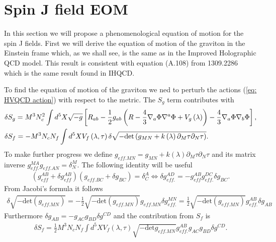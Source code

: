 \documentclass[a4paper,12pt]{article}
\begin{document}
\section{Spin J field EOM}

In this section we will propose a phenomenological equation of motion for the spin J fields. First we will derive the equation of motion of the graviton in the Einstein frame which, as we shall see, is the same as in the Improved Holographic QCD model. This result is consistent with equation (A.108) from 1309.2286 which is the same result found in IHQCD.

To find the equation of motion of the graviton we ned to perturb the actions (\ref{eq: HVQCD action}) with respect to the metric. The $S_g$ term contributes with
\begin{align}
&\delta S_g = M^3 N_c^2 \int d^5X \sqrt{-g} \left[ R_{ab} - \frac{1}{2} g_{ab} \left( R -\frac{4}{3} \nabla_a \Phi \nabla^a \Phi + V_g \left(\lambda\right) \right)- \frac{4}{3} \nabla_a \Phi \nabla_b \Phi \right],  \notag \\
& \delta S_f = - M^3 N_c N_f \int d^5 X V_f \left( \lambda, \tau \right) \delta \sqrt{- \text{det} \left( g_{MN} + k\left(\lambda\right) \partial_M \tau \partial_N \tau \right)}.
\end{align}
To make further progress we define $g_{eff. MN} = g_{MN} +  k\left(\lambda\right) \partial_M \tau \partial_N \tau $ and its matrix inverse $g_{eff.}^{MA}g_{eff. AN} = \delta^M_N$. The following identity will be useful
\begin{align}
\left( g_{eff}^{AB} + \delta  g_{eff}^{AB}\right) \left( g_{eff. BC} + \delta g_{BC}\right) = \delta^A_C \Leftrightarrow \delta g_{eff.}^{AD} = - g_{eff}^{AB} g_{eff.}^{DC} \delta g_{BC}.
\end{align}
From Jacobi's formula it follows
\begin{align}
\delta \sqrt{-\text{det} \left(g_{eff. MN}\right)} = -\frac{1}{2} \sqrt{-\text{det} \left(g_{eff. MN}\right)} g_{eff. MN} \delta g_{eff.}^{MN} = \frac{1}{2} \sqrt{-\text{det} \left(g_{eff. MN}\right)} g_{eff.}^{AB} \delta g_{AB}
\end{align}
Furthermore $\delta g_{AB} = - g_{AC} g_{BD} \delta g^{CD}$ and the contribution from $S_f$ is
\begin{align}
\delta S_f = \frac{1}{2} M^3 N_c N_f \int d^5X V_f\left(\lambda, \tau\right) \sqrt{-\text{det} g_{eff. MN}} g_{eff.}^{AB}g_{AC}g_{BD} \delta g^{CD}.
\end{align}
\end{document}
